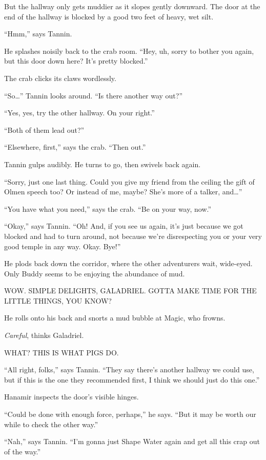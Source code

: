 \documentclass[smalldemyvopaper,11pt,twoside,onecolumn,openright,extrafontsizes]{memoir}
\begin{document}
But the hallway only gets muddier as it slopes gently downward. The door
at the end of the hallway is blocked by a good two feet of heavy, wet
silt.

``Hmm,'' says Tannin.

He splashes noisily back to the crab room. ``Hey, uh, sorry to bother
you again, but this door down here? It's pretty blocked.''

The crab clicks its claws wordlessly.

``So\ldots{}'' Tannin looks around. ``Is there another way out?''

``Yes, yes, try the other hallway. On your right.''

``Both of them lead out?''

``Elsewhere, first,'' says the crab. ``Then out.''

Tannin gulps audibly. He turns to go, then swivels back again.

``Sorry, just one last thing. Could you give my friend from the ceiling
the gift of Olmen speech too? Or instead of me, maybe? She's more of a
talker, and\ldots{}''

``You have what you need,'' says the crab. ``Be on your way, now.''

``Okay,'' says Tannin. ``Oh! And, if you see us again, it's just because
we got blocked and had to turn around, not because we're disrespecting
you or your very good temple in any way. Okay. Bye!''

He plods back down the corridor, where the other adventurers wait,
wide-eyed. Only Buddy seems to be enjoying the abundance of mud.

WOW. SIMPLE DELIGHTS, GALADRIEL. GOTTA MAKE TIME FOR THE LITTLE THINGS,
YOU KNOW?

He rolls onto his back and snorts a mud bubble at Magic, who frowns.

\emph{Careful}, thinks Galadriel.

WHAT? THIS IS WHAT PIGS DO.

``All right, folks,'' says Tannin. ``They say there's another hallway we
could use, but if this is the one they recommended first, I think we
should just do this one.''

Hanamir inspects the door's visible hinges.

``Could be done with enough force, perhaps,'' he says. ``But it may be
worth our while to check the other way.''

``Nah,'' says Tannin. ``I'm gonna just Shape Water again and get all
this crap out of the way.''
\end{document}
